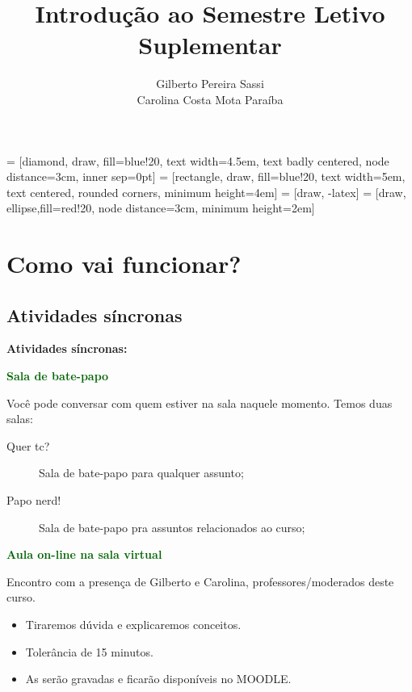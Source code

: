 \documentclass[9pt]{beamer}
\date{}
\title[Boas-vindas!]{Introdução ao Semestre Letivo Suplementar}
\author[Gilberto  e Carolina]{Gilberto Pereira Sassi\\ Carolina Costa Mota Paraíba}
\institute[IME -- UFBA]{Universidade Federal da Bahia \\ Instituto de Matem\'{a}tica e Estat\'{i}stica\\ Departamento de Estat\'{i}stica }
\begin{document}
	
 = [diamond, draw, fill=blue!20, 
text width=4.5em, text badly centered, node distance=3cm, inner sep=0pt]
 = [rectangle, draw, fill=blue!20, 
text width=5em, text centered, rounded corners, minimum height=4em]
 = [draw, -latex]
 = [draw, ellipse,fill=red!20, node distance=3cm,
minimum height=2em]
	
\begin{frame}{}
	\maketitle
\end{frame}

\section{Como vai funcionar?}

\subsection{Atividades síncronas}

\begin{frame}{}


\textbf{Atividades síncronas:}
\vfill

\textcolor{darkgreen}{\bf Sala de bate-papo}

Você pode conversar com quem estiver na sala naquele momento. Temos duas salas:


\begin{description}
	\item[Quer tc?] Sala de bate-papo para qualquer assunto;
	\item[Papo nerd!] Sala de bate-papo pra assuntos relacionados ao curso;
\end{description}
\vfill
	
\textcolor{darkgreen}{\bf Aula on-line na sala virtual}
	
Encontro com a presença de Gilberto e Carolina, professores/moderados deste curso.

\begin{itemize}
	\item Tiraremos dúvida e explicaremos conceitos.
	\item Tolerância de 15 minutos.
	\item As serão gravadas e ficarão disponíveis no MOODLE.
\end{itemize}  

\end{frame}
\end{document}
